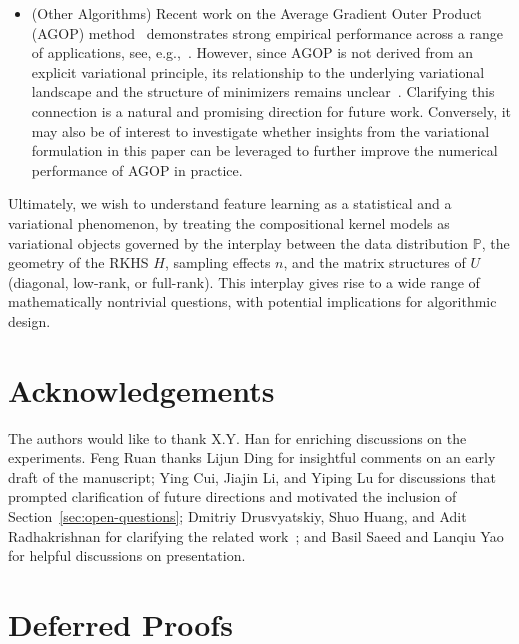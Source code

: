\documentclass[sn-mathphys-num]{sn-jnl}%
\numberwithin{equation}{section}
\theoremstyle{thmstyleone}%
\theoremstyle{thmstyletwo}%
\theoremstyle{thmstylethree}%
\begin{document}
\begin{itemize}
\vspace{.5em} 
\item (Other Algorithms) 
Recent work on the Average Gradient Outer Product (AGOP) method~\cite{Adit24A} demonstrates strong empirical performance across a range of applications, see, e.g.,~\cite{Beagleholeetal25}. However, since AGOP is not derived from an explicit variational principle, its relationship to the underlying variational landscape and the structure of minimizers remains unclear~\cite{RadhakrishnanBeDr25}. Clarifying this connection is a natural and promising direction for future work. Conversely, it may also be of interest to investigate whether insights from the variational formulation in this paper can be leveraged to further improve the numerical performance of AGOP in practice.
\end{itemize}

\vspace{.5em} 
Ultimately, we wish to understand feature learning as a statistical and a variational phenomenon, by treating the compositional kernel models as variational objects governed by the interplay between
the data distribution $\mathbb{P}$, the geometry of the RKHS $H$, sampling effects $n$,
and the matrix structures of $U$ (diagonal, low-rank, or full-rank).
This interplay gives rise to a wide range of mathematically
nontrivial questions, with potential implications for algorithmic design.






\section{Acknowledgements} 
\indent\indent
The authors would like to thank X.Y. Han for enriching discussions on the experiments. 
Feng Ruan thanks Lijun Ding for insightful comments on an early draft of the manuscript; Ying Cui, Jiajin Li, and Yiping Lu for discussions that prompted clarification of future directions and motivated the inclusion of Section~\ref{sec:open-questions}; Dmitriy Drusvyatskiy, Shuo Huang, and Adit Radhakrishnan for clarifying the related work~\cite{RadhakrishnanBeDr25, ZhuDaDrFa25, HuangLaDePoRo25}; and Basil Saeed and Lanqiu Yao for helpful discussions on presentation.


  


\newpage
\appendix 

\section{Deferred Proofs} 
\end{document}
